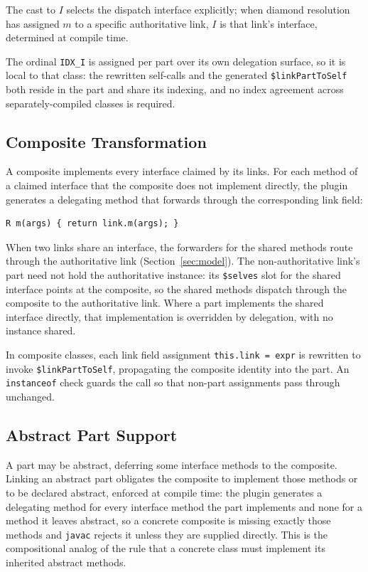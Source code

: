 \documentclass[sigplan,10pt,review,anonymous]{acmart}
\theoremstyle{acmplain}
\newcommand{\code}[1]{\texttt{#1}}
\begin{document}
The cast to $I$ selects the dispatch interface explicitly; when diamond
resolution has assigned $m$ to a specific authoritative link, $I$ is that
link's interface, determined at compile time.

The ordinal \code{IDX\_I} is assigned per part over its own
delegation surface, so it is local to that class: the rewritten self-calls and
the generated \code{\$linkPartToSelf} both reside in the part and share its
indexing, and no index agreement across separately-compiled classes is required.

\subsection{Composite Transformation}

A composite implements every interface claimed by its links. For each method of
a claimed interface that the composite does not implement directly, the plugin
generates a delegating method that forwards through the corresponding
link field:

\begin{lstlisting}
R m(args) { return link.m(args); }
\end{lstlisting}

When two links share an interface, the forwarders for the
shared methods route through the authoritative link
(Section~\ref{sec:model}). The non-authoritative link's part need not hold
the authoritative instance: its \code{\$selves} slot for the shared interface
points at the composite, so the shared methods dispatch through the composite
to the authoritative link. Where a part implements the shared interface
directly, that implementation is overridden by delegation, with no instance
shared.

In composite classes, each link field assignment \code{this.link = expr}
is rewritten to invoke \code{\$linkPartToSelf}, propagating the composite
identity into the part. An \code{instanceof} check guards the call so
that non-part assignments pass through unchanged.

\subsection{Abstract Part Support}

A part may be abstract, deferring some interface methods to the
composite. Linking an abstract part obligates the composite to implement those
methods or to be declared abstract, enforced at compile time: the plugin
generates a delegating method for every interface method the part implements and
none for a method it leaves abstract, so a concrete composite is missing exactly
those methods and \texttt{javac} rejects it unless they are supplied directly.
This is the compositional analog of the rule that a concrete class must implement
its inherited abstract methods.
\end{document}

